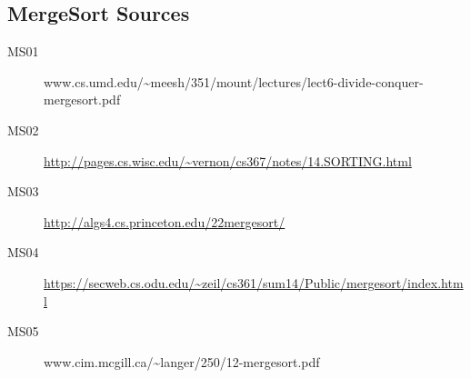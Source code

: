 \documentclass[10pt, letterpaper]{article}
\begin{document}
\subsection*{MergeSort Sources}
\label{sec:orgd102687}
\begin{description}
\item[{MS01}] www.cs.umd.edu/\textasciitilde{}meesh/351/mount/lectures/lect6-divide-conquer-mergesort.pdf
\item[{MS02}] \url{http://pages.cs.wisc.edu/\~vernon/cs367/notes/14.SORTING.html}
\item[{MS03}] \url{http://algs4.cs.princeton.edu/22mergesort/}
\item[{MS04}] \url{https://secweb.cs.odu.edu/\~zeil/cs361/sum14/Public/mergesort/index.html}
\item[{MS05}] www.cim.mcgill.ca/\textasciitilde{}langer/250/12-mergesort.pdf
\end{description}
\end{document}
